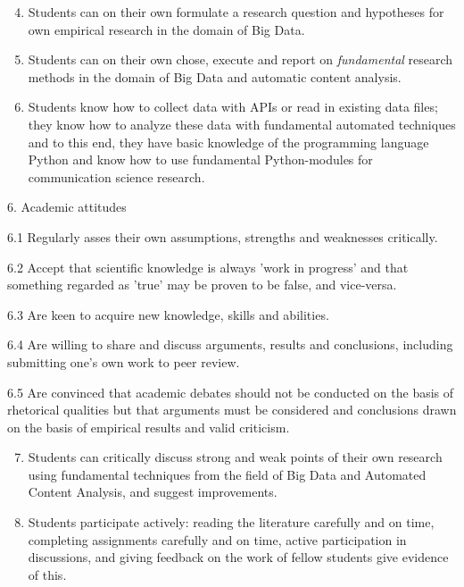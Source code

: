 \begin{enumerate}[A]
\setcounter{enumi}{3}
\item Students can on their own formulate a research question and hypotheses for own empirical research in the domain of Big Data.
\item Students can on their own chose, execute and report on \emph{fundamental} research methods in the domain of Big Data and automatic content analysis.
\item Students know how to collect data with APIs or read in existing data files; they know how to analyze these data with fundamental automated techniques and to this end, they have basic knowledge of the programming language Python and know how to use fundamental Python-modules for communication science research.
\end{enumerate}


{\footnotesize{
6. Academic attitudes

6.1 	Regularly asses their own assumptions, strengths and weaknesses critically.


6.2	Accept that scientific knowledge is always 'work in progress' and that something
regarded as 'true' may be proven to be false, and vice-versa.


6.3 	Are keen to acquire new knowledge, skills and abilities. 


6.4 	Are willing to share and discuss arguments, results and conclusions, including submitting one's own work to peer review. 


6.5 	Are convinced that academic debates should not be conducted on the basis of rhetorical qualities but that arguments must be considered and conclusions drawn on the basis of empirical results and valid criticism.

 }}

\begin{enumerate}[A]
\setcounter{enumi}{6}
\item Students can critically discuss strong and weak points of their own research using fundamental techniques from the field of Big Data and Automated Content Analysis, and suggest improvements.
\item Students participate actively: reading the literature carefully and on time, completing assignments carefully and on time, active participation in discussions, and giving feedback on the work of fellow students give evidence of this.
\end{enumerate}

